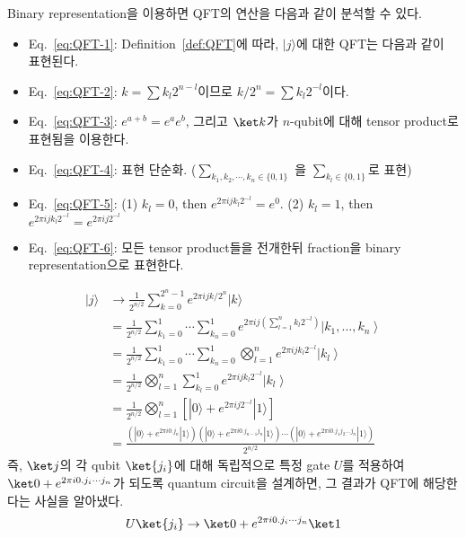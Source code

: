\newpage
Binary representation을 이용하면 QFT의 연산을 다음과 같이 분석할 수 있다.
\begin{itemize}
  \item Eq.~\eqref{eq:QFT-1}: Definition~\ref{def:QFT}에 따라, $|j\rangle$에 대한 QFT는 다음과 같이 표현된다.
  \item Eq.~\eqref{eq:QFT-2}: $k = \sum k_l 2^{n-l}$이므로 $k/2^n = \sum k_l 2^{-l}$이다.
  \item Eq.~\eqref{eq:QFT-3}: $e^{a+b} = e^a e^b$, 그리고 $\ket k$가 $n$-qubit에 대해 tensor product로 표현됨을 이용한다.
  \item Eq.~\eqref{eq:QFT-4}: 표현 단순화. ($\sum_{k_1, k_2, \cdots, k_n \in \{0, 1\}}$ 을 $\sum_{k_l \in \{0, 1\}}$로 표현)
  \item Eq.~\eqref{eq:QFT-5}: (1) $k_l=0$, then $e^{2\pi ij k_l 2^{-l}} = e^0$. (2) $k_l=1$, then $e^{2\pi ij k_l 2^{-l}} = e^{2\pi i j 2^{-l}}$
  \item Eq.~\eqref{eq:QFT-6}: 모든 tensor product들을 전개한뒤 fraction을 binary representation으로 표현한다.
\end{itemize}
\begin{align}
  |j\rangle & \rightarrow \frac{1}{2^{n / 2}} \sum_{k=0}^{2^n-1} e^{2 \pi i j k / 2^n}|k\rangle \label{eq:QFT-1} \\
  & =\frac{1}{2^{n / 2}} \sum_{k_1=0}^1 \cdots \sum_{k_n=0}^1 e^{2 \pi i j\left(\sum_{l=1}^n k_l 2^{-l}\right)}\left|k_1, \ldots, k_n\right\rangle \label{eq:QFT-2} \\
  & =\frac{1}{2^{n / 2}} \sum_{k_1=0}^1 \cdots \sum_{k_n=0}^1 \bigotimes_{l=1}^n e^{2 \pi i j k_l 2^{-l}}\left|k_l\right\rangle  \label{eq:QFT-3} \\
  & =\frac{1}{2^{n / 2}} \bigotimes_{l=1}^n \sum_{k_l=0}^1 e^{2 \pi i j k_l 2^{-l}}\left|k_l\right\rangle \label{eq:QFT-4} \\
  & =\frac{1}{2^{n / 2}} \bigotimes_{l=1}^n\left[|0\rangle+e^{2 \pi i j 2^{-l}}|1\rangle\right]  \label{eq:QFT-5} \\
  & =\frac{\left(|0\rangle+e^{2 \pi i 0 . j_n}|1\rangle\right)\left(|0\rangle+e^{2 \pi i 0 . j_{n-1} j_n}|1\rangle\right) \cdots\left(|0\rangle+e^{2 \pi i 0 . j_1 j_2 \ldots j_n}|1\rangle\right)}{2^{n / 2}} \label{eq:QFT-6}
\end{align}
즉, $\ket j$의 각 qubit $\ket{j_i}$에 대해 독립적으로 특정 gate $U$를 적용하여 $\ket 0 + e^{2\pi i 0.j_i \cdots j_n}$가 되도록 quantum circuit을 설계하면, 그 결과가 QFT에 해당한다는 사실을 알아냈다.
\begin{equation*}
  U \ket {j_i} \rightarrow \ket 0 + e^{2\pi i 0.j_i \cdots j_n} \ket 1
\end{equation*}


